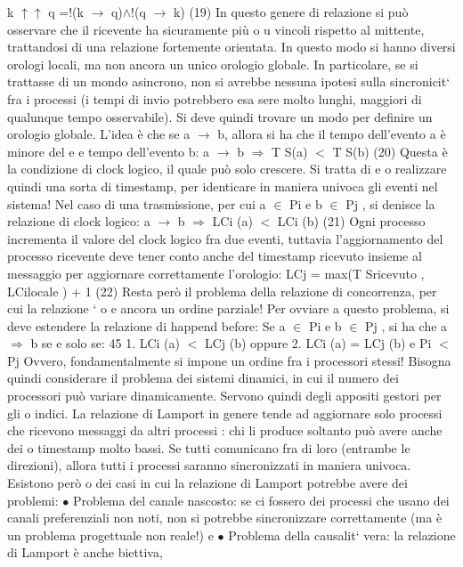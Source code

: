 k $\uparrow$$\uparrow$ q =!(k $\rightarrow$ q)$\land$!(q $\rightarrow$ k)
(19)
In questo genere di relazione si può osservare che il ricevente ha sicuramente più
o
u
vincoli rispetto al mittente, trattandosi di una relazione fortemente orientata.
In questo modo si hanno diversi orologi locali, ma non ancora un unico orologio globale. In particolare, se si trattasse
di un mondo asincrono, non si avrebbe
nessuna ipotesi sulla sincronicit` fra i processi (i tempi di invio potrebbero esa
sere molto lunghi, maggiori di qualunque tempo osservabile). Si deve quindi
trovare un modo per definire un orologio globale.
L'idea è che se a $\rightarrow$ b, allora si ha che il tempo dell'evento a è minore del
e
e
tempo dell'evento b:
a $\rightarrow$ b $\Rightarrow$ T S(a) $<$ T S(b)
(20)
Questa è la condizione di clock logico, il quale può solo crescere. Si tratta di
e
o
realizzare quindi una sorta di timestamp, per identicare in maniera univoca gli
eventi nel sistema!
Nel caso di una trasmissione, per cui a $\in$ Pi e b $\in$ Pj , si denisce la relazione
di clock logico:
a $\rightarrow$ b $\Rightarrow$ LCi (a) $<$ LCi (b)
(21)
Ogni processo incrementa il valore del clock logico fra due eventi, tuttavia
l'aggiornamento del processo ricevente deve tener conto anche del timestamp
ricevuto insieme al messaggio per aggiornare correttamente l'orologio:
LCj = max(T Sricevuto , LCilocale ) + 1
(22)
Resta però il problema della relazione di concorrenza, per cui la relazione `
o
e
ancora un ordine parziale! Per ovviare a questo problema, si deve estendere la
relazione di happend before:
Se a $\in$ Pi e b $\in$ Pj , si ha che a $\Rightarrow$ b se e solo se:
45
1. LCi (a) $<$ LCj (b) oppure
2. LCi (a) = LCj (b) e Pi $<$ Pj
Ovvero, fondamentalmente si impone un ordine fra i processori stessi! Bisogna
quindi considerare il problema dei sistemi dinamici, in cui il numero dei processori può variare dinamicamente. Servono
quindi degli appositi gestori per gli
o
indici.
La relazione di Lamport in genere tende ad aggiornare solo processi che
ricevono messaggi da altri processi : chi li produce soltanto può avere anche dei
o
timestamp molto bassi. Se tutti comunicano fra di loro (entrambe le direzioni),
allora tutti i processi saranno sincronizzati in maniera univoca. Esistono però
o
dei casi in cui la relazione di Lamport potrebbe avere dei problemi:
$\bullet$ Problema del canale nascosto: se ci fossero dei processi che usano dei
canali preferenziali non noti, non si potrebbe sincronizzare correttamente
(ma è un problema progettuale non reale!)
e
$\bullet$ Problema della causalit` vera: la relazione di Lamport è anche biettiva,
$$
